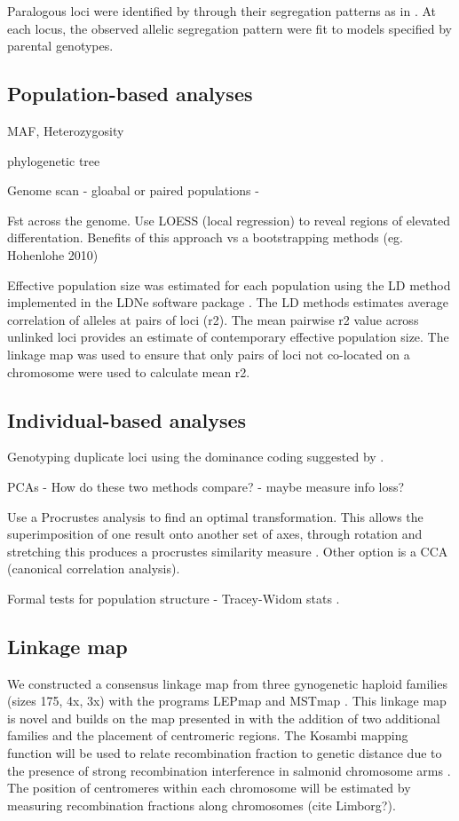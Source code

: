 \documentclass[12pt,  one column]{article}
\begin{document}
Paralogous loci were identified by through their segregation patterns as in \citet{Waples2015}.  At each locus, the observed allelic segregation pattern were fit to models specified by parental genotypes.

\subsection*{Population-based analyses} 

MAF, Heterozygosity

phylogenetic tree

Genome scan - gloabal or paired populations - 	

Fst across the genome.  Use LOESS (local regression) to reveal regions of elevated differentation.  Benefits of this approach vs a bootstrapping methods (eg. Hohenlohe 2010)

Effective population size was estimated for each population using the LD method implemented in the LDNe software package \cite{Waples2010}.  The LD methods estimates average correlation of alleles at pairs of loci (r2). The mean pairwise r2 value across unlinked loci provides an estimate of contemporary effective population size. The linkage map was used to ensure that only pairs of loci not co-located on a chromosome were used to calculate mean r2.

\subsection*{Individual-based analyses} 
Genotyping duplicate loci using the dominance coding suggested by \cite{Patterson2006}. 

PCAs - How do these two methods compare? - maybe measure info loss?

Use a Procrustes analysis to find an optimal transformation.  This allows the superimposition of one result onto another set of axes, through rotation and stretching this produces a procrustes similarity measure \cite{Peres2001}.  Other option is a CCA (canonical correlation analysis).  

Formal tests for population structure - Tracey-Widom stats \citep{Tracy1994}.

\subsection*{Linkage map}

We constructed a consensus linkage map from three gynogenetic haploid families (sizes 175, 4x, 3x) with the programs LEPmap \citep{Rastas2013} and MSTmap \citep{Wu2008}. This linkage map is novel and builds on the map presented in \citet{Waples2015} with the addition of two additional families and the placement of centromeric regions.  The Kosambi mapping function \citep{Kosambi1943} will be used to relate recombination fraction to genetic distance  due to the presence of strong recombination interference in salmonid chromosome arms \citep{Thorgaard1983}.  The position of centromeres within each chromosome will be estimated by measuring recombination fractions along chromosomes (cite Limborg?).
\end{document}
